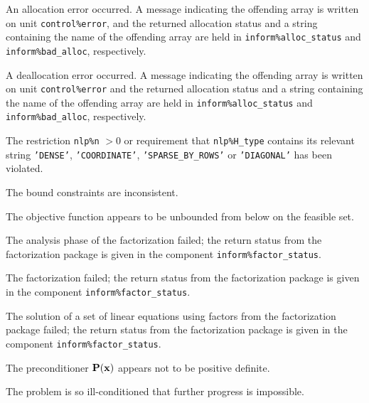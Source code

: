 \documentclass{galahad}
\begin{document}
\begin{description}

 An allocation error occurred.
A message indicating the offending
array is written on unit {\tt control\%error}, and the returned allocation
status and a string containing the name of the offending array
are held in {\tt inform\%alloc\_\-status}
and {\tt inform\%bad\_alloc}, respectively.

 A deallocation error occurred.
A message indicating the offending
array is written on unit {\tt control\%error} and the returned allocation
status and a string containing the name of the offending array
are held in {\tt inform\%alloc\_\-status}
and {\tt inform\%bad\_alloc}, respectively.

  The restriction {\tt nlp\%n} $> 0$
  or requirement that {\tt nlp\%H\_type} contains its relevant string
  {\tt 'DENSE'}, {\tt 'COORDINATE'}, {\tt 'SPARSE\_BY\_ROWS'}
  or {\tt 'DIAGONAL'}
  has been violated.


 The bound constraints are inconsistent.

  The objective function appears to be unbounded
 from below on the feasible set.

 The analysis phase of the factorization failed;
 the return status from the factorization
    package is given in the component {\tt inform\%fac\-t\-or\_status}.

 The factorization failed;
 the return status from the factorization
    package is given in the component {\tt inform\%fac\-t\-or\_status}.

 The solution of a set of linear equations
 using factors from the factorization package failed;
 the return status from the factorization
    package is given in the component {\tt inform\%fac\-t\-or\_status}.

 The preconditioner ${\mathbf{P}}({\mathbf{x}})$ appears not to
  be positive definite.

 The problem is so ill-conditioned that
  further progress is impossible.


\end{description}
\end{document}
